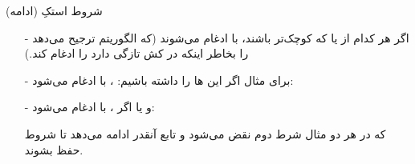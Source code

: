 \begin{frame}{شروط استکِ  (ادامه)}
\begin{itemize}\itemr
\item[-]
اگر
هر کدام از  یا  که کوچک‌تر باشند، با  ادغام می‌شوند (که الگوریتم ترجیح می‌دهد  را بخاطر اینکه در کش تازگی دارد را ادغام کند.)

\item[-]
برای مثال اگر این ها را داشته باشیم:
،
با
ادغام می‌شود:
\begin{lfl}
\end{lfl}

\item[-]
و یا اگر
،
با
ادغام می‌شود:
\begin{lfl}
\end{lfl}

که در هر دو مثال شرط دوم نقض می‌شود و تابع 
آنقدر ادامه می‌دهد تا شروط حفظ بشوند.
\end{itemize}
\end{frame}